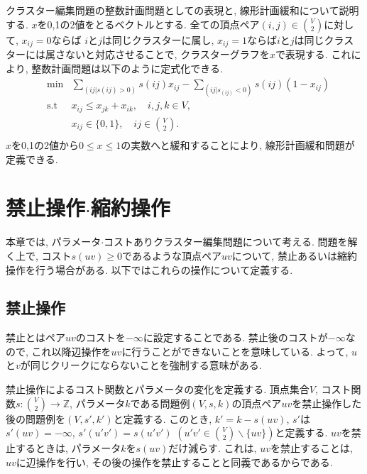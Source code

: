 \documentclass[10pt,a4j,twocolumn, dvipdfmx]{bxjsarticle}
\begin{document}
クラスター編集問題の整数計画問題としての表現と, 線形計画緩和について説明する.
$x$を0,1の2値をとるベクトルとする. 全ての頂点ペア$(i,j) \in \binom{V}{2}$に対して, $x_{ij}=0$ならば
$i$と$j$は同じクラスターに属し, $x_{ij}=1$ならば$i$と$j$は同じクラスターには属さないと対応させることで, クラスターグラフを$x$で表現する.
これにより, 整数計画問題は以下のように定式化できる.
\begin{equation*}
    \begin{aligned}
        & \text{min}
            & {\sum_{(ij|s(ij)>0)}  s(ij) x_{ij} - \sum_{(ij|s_(ij)<0)} s(ij) (1-x_{ij})} \\
        & \text{s.t}
            & x_{ij} \le x_{jk}+x_{ik}, \quad i,j,k \in V,\\
            &  &x_{ij} \in \{0,1\}, \quad ij \in \binom{V}{2}.\\
    \end{aligned}
\end{equation*}
$x$を0,1の2値から$0 \le x \le 1$の実数へと緩和することにより, 線形計画緩和問題が定義できる.\\

\section{禁止操作$\cdot$縮約操作}
本章では, パラメータ$\cdot$コストありクラスター編集問題について考える.
問題を解く上で, コスト$s(uv) \ge 0$であるような頂点ペア$uv$について, $\textbf{禁止}$あるいは$\textbf{縮約}$操作を行う場合がある.
以下ではこれらの操作について定義する.


\subsection{禁止操作}
$\textbf{禁止}$とはペア$uv$のコストを$-\infty$に設定することである.
禁止後のコストが$-\infty$なので, これ以降辺操作を$uv$に行うことができないことを意味している.
よって, $u$と$v$が同じクリークにならないことを強制する意味がある.\par
禁止操作によるコスト関数とパラメータの変化を定義する.
頂点集合$V$, コスト関数$s:\binom{V}{2} \rightarrow \mathbb{Z}$, パラメータ$k$である問題例$(V,s,k)$の頂点ペア$uv$を禁止操作した後の問題例を$(V,s',k')$と定義する.
このとき, $k'=k-s(uv)$, $s'$は$s'(uv)=-\infty$, $s'(u'v')=s(u'v')$ $(u'v' \in \binom{V}{2} \backslash \{uv\})$と定義する.
$uv$を禁止するときは, パラメータ$k$を$s(uv)$だけ減らす. これは, $uv$を禁止することは, $uv$に辺操作を行い, その後の操作を禁止することと同義であるからである.
\end{document}
